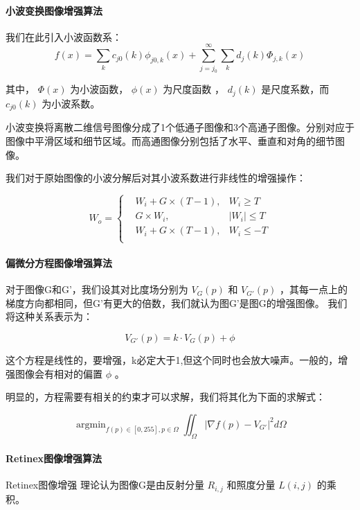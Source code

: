 \paragraph{小波变换图像增强算法}
我们在此引入小波函数系：
\begin{equation}
	f(x) = \sum_{k}c_{j0}(k)\phi_{j0,k}(x) + \sum_{j=j_0}^{\infty}\sum_{k}d_j(k)\Phi_{j,k}(x)
\end{equation}

其中， $ \Phi(x) $ 为小波函数， $ \phi(x) $ 为尺度函数 ， $ d_j(k) $ 是尺度系数，而 $ c_{j0}(k) $ 为小波系数。

小波变换将离散二维信号图像分成了1个低通子图像和3个高通子图像。分别对应于图像中平滑区域和细节区域。而高通图像分别包括了水平、垂直和对角的细节图像。

我们对于原始图像的小波分解后对其小波系数进行非线性的增强操作：

\begin{equation}
	\label{}
	W_o =\left\{
		\begin{aligned}
		& W_i+G \times (T-1) , & W_i \ge T \\
		& G \times W_i , & \lvert W_i \rvert \leq T \\
		& W_i+G \times (T-1) , & W_i \le -T \\
		\end{aligned}
		\right.
\end{equation}

\paragraph{偏微分方程图像增强算法}
对于图像G和G'，我们设其对比度场分别为 $ V_{G}(p) $ 和 $ V_{G'}(p) $ ，其每一点上的梯度方向都相同，但G'有更大的倍数，我们就认为图G'是图G的增强图像。
我们将这种关系表示为：

\begin{equation}
	V_{G'}(p) = k \cdot V_{G}(p) + \phi	
\end{equation}

这个方程是线性的，要增强，k必定大于1,但这个同时也会放大噪声。一般的，增强图像会有相对的偏置 $ \phi $ 。

明显的，方程需要有相关的约束才可以求解，我们将其化为下面的求解式：

\begin{equation}
	\mathop{\arg\min}_{f(p)\in[0,255], p \in \Omega} \iint_{\Omega} \lvert \nabla f(p) - V_{G'} \rvert ^{2} d\Omega
\end{equation}

\paragraph{Retinex图像增强算法}
Retinex图像增强 理论认为图像G是由反射分量 $ R_{i,j} $ 和照度分量 $ L(i,j) $ 的乘积。

